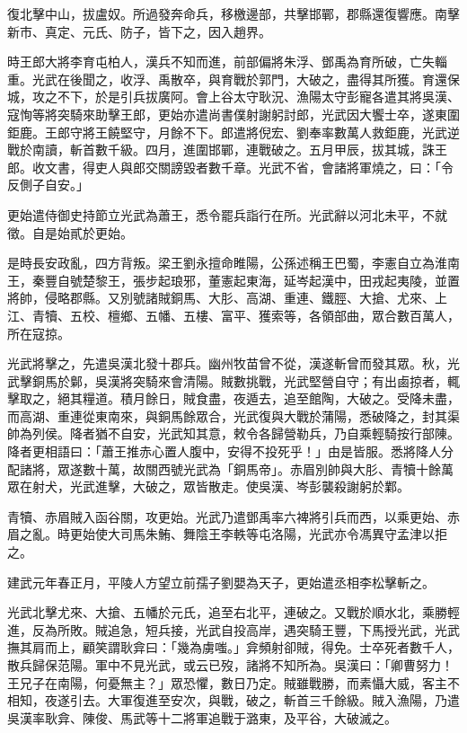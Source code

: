 \begin{pinyinscope}
復北擊中山，拔盧奴。所過發奔命兵，移檄邊部，共擊邯鄲，郡縣還復響應。南擊新市、真定、元氏、防子，皆下之，因入趙界。

時王郎大將李育屯柏人，漢兵不知而進，前部偏將朱浮、鄧禹為育所破，亡失輜重。光武在後聞之，收浮、禹散卒，與育戰於郭門，大破之，盡得其所獲。育還保城，攻之不下，於是引兵拔廣阿。會上谷太守耿況、漁陽太守彭寵各遣其將吳漢、寇恂等將突騎來助擊王郎，更始亦遣尚書僕射謝躬討郎，光武因大饗士卒，遂東圍鉅鹿。王郎守將王饒堅守，月餘不下。郎遣將倪宏、劉奉率數萬人救鉅鹿，光武逆戰於南讀，斬首數千級。四月，進圍邯鄲，連戰破之。五月甲辰，拔其城，誅王郎。收文書，得吏人與郎交關謗毀者數千章。光武不省，會諸將軍燒之，曰：「令反側子自安。」

更始遣侍御史持節立光武為蕭王，悉令罷兵詣行在所。光武辭以河北未平，不就徵。自是始貳於更始。

是時長安政亂，四方背叛。梁王劉永擅命睢陽，公孫述稱王巴蜀，李憲自立為淮南王，秦豐自號楚黎王，張步起琅邪，董憲起東海，延岑起漢中，田戎起夷陵，並置將帥，侵略郡縣。又別號諸賊銅馬、大肜、高湖、重連、鐵脛、大搶、尤來、上江、青犢、五校、檀鄉、五幡、五樓、富平、獲索等，各領部曲，眾合數百萬人，所在寇掠。

光武將擊之，先遣吳漢北發十郡兵。幽州牧苗曾不從，漢遂斬曾而發其眾。秋，光武擊銅馬於鄡，吳漢將突騎來會清陽。賊數挑戰，光武堅營自守；有出鹵掠者，輒擊取之，絕其糧道。積月餘日，賊食盡，夜遁去，追至館陶，大破之。受降未盡，而高湖、重連從東南來，與銅馬餘眾合，光武復與大戰於蒲陽，悉破降之，封其渠帥為列侯。降者猶不自安，光武知其意，敕令各歸營勒兵，乃自乘輕騎按行部陳。降者更相語曰：「蕭王推赤心置人腹中，安得不投死乎！」由是皆服。悉將降人分配諸將，眾遂數十萬，故關西號光武為「銅馬帝」。赤眉別帥與大肜、青犢十餘萬眾在射犬，光武進擊，大破之，眾皆散走。使吳漢、岑彭襲殺謝躬於鄴。

青犢、赤眉賊入函谷關，攻更始。光武乃遣鄧禹率六裨將引兵而西，以乘更始、赤眉之亂。時更始使大司馬朱鮪、舞陰王李軼等屯洛陽，光武亦令馮異守孟津以拒之。

建武元年春正月，平陵人方望立前孺子劉嬰為天子，更始遣丞相李松擊斬之。

光武北擊尤來、大搶、五幡於元氏，追至右北平，連破之。又戰於順水北，乘勝輕進，反為所敗。賊追急，短兵接，光武自投高岸，遇突騎王豐，下馬授光武，光武撫其肩而上，顧笑謂耿弇曰：「幾為虜嗤。」弇頻射卻賊，得免。士卒死者數千人，散兵歸保范陽。軍中不見光武，或云已歿，諸將不知所為。吳漢曰：「卿曹努力！王兄子在南陽，何憂無主？」眾恐懼，數日乃定。賊雖戰勝，而素懾大威，客主不相知，夜遂引去。大軍復進至安次，與戰，破之，斬首三千餘級。賊入漁陽，乃遣吳漢率耿弇、陳俊、馬武等十二將軍追戰于潞東，及平谷，大破滅之。


\end{pinyinscope}
